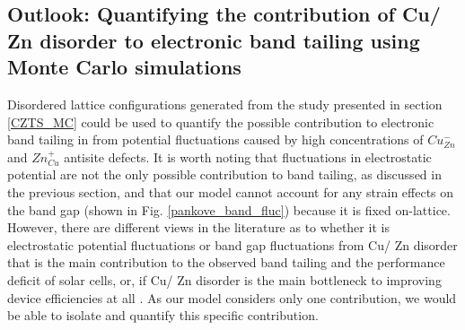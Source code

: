 \documentclass[11pt, twoside]{report}
\begin{document}





\subsection{Outlook: Quantifying the contribution of Cu/ Zn disorder to electronic band tailing using Monte Carlo simulations}

Disordered lattice configurations generated from the study presented in section \ref{CZTS_MC} could be used to quantify the possible contribution to electronic band tailing in {\CZTS} from potential fluctuations caused by high concentrations of $Cu_{Zn}^{-}$ and $Zn_{Cu}^{+}$ antisite defects. 
It is worth noting that fluctuations in electrostatic potential are not the only possible contribution to band tailing, as discussed in the previous section, and that our model cannot account for any strain effects on the band gap (shown in Fig. \ref{pankove_band_fluc}) because it is fixed on-lattice. However, there are different views in the literature as to whether it is electrostatic potential fluctuations or band gap fluctuations from Cu/ Zn disorder that is the main contribution to the observed band tailing and the performance deficit of {\CZTS} solar cells, or, if Cu/ Zn disorder is the main bottleneck to improving device efficiencies at all \cite{culprit, kesterite_band_tails, band_tail}. As our model considers only one contribution, we would be able to isolate and quantify this specific contribution.
\end{document}
